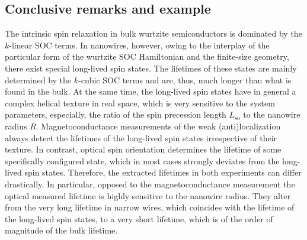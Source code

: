 \documentclass[superscriptaddress,noshowpacs,noshowkeys, twocolumn, floatfix,aps, prb,reprint]{revtex4-1}
\begin{document}
%


\subsection{Conclusive remarks and example}\label{sec:relax_nanowire_remarks}

The intrinsic spin relaxation in bulk wurtzite semiconductors is dominated by the $k$-linear SOC terms.
In nanowires, however, owing to the interplay of the particular form of the wurtzite SOC Hamiltonian and the finite-size geometry, there exist special long-lived spin states.
The lifetimes of these states are mainly determined by the $k$-cubic SOC terms and are, thus, much longer than what is found in the bulk. 
At the same time, the long-lived spin states have in general a complex helical texture in real space, which is very sensitive to the system parameters, especially, the ratio of the spin precession length $L_\text{so}$ to the  nanowire radius $R$.
Magnetoconductance measurements of the weak (anti)localization always detect the lifetimes of the long-lived spin states irrespective of their texture.
In contrast, optical spin orientation determines the lifetime of some specifically configured state, which in most cases strongly deviates from the long-lived spin states.
Therefore, the extracted lifetimes in both experiments can differ drastically.
In particular, opposed to the magnetoconductance measurement the optical measured lifetime is highly sensitive to the nanowire radius.
They alter from the very long lifetime in narrow wires, which coincides with the lifetime of the long-lived spin states, to a very short lifetime, which is of the order of magnitude of the bulk lifetime.
\end{document}
